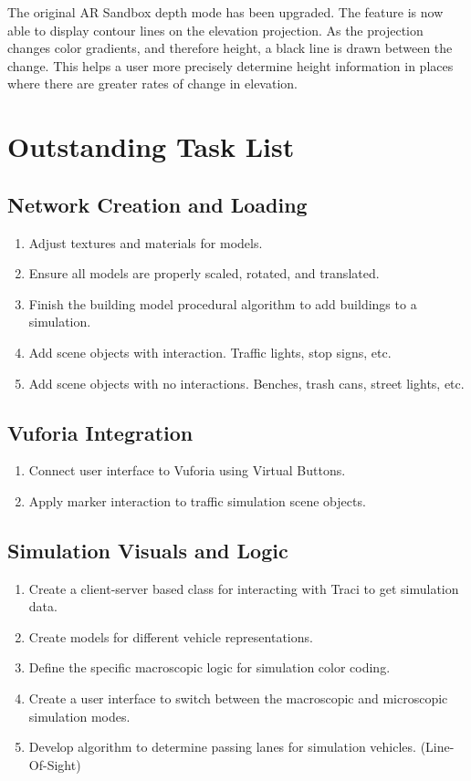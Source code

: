 \documentclass[letterpaper, 10pt, onecolumn, draftclsnofoot]{IEEEtran}
\begin{document}
        The original AR Sandbox depth mode has been upgraded. The feature is now able to display contour lines on the elevation projection. As the projection changes color gradients, and therefore height, a black line is drawn between the change. This helps a user more precisely determine height information in places where there are greater rates of change in elevation. \\

\section{Outstanding Task List}
    \subsection{Network Creation and Loading}
        \begin{enumerate}
            \item Adjust textures and materials for models.
            \item Ensure all models are properly scaled, rotated, and translated.
            \item Finish the building model procedural algorithm to add buildings to a simulation.
            \item Add scene objects with interaction. Traffic lights, stop signs, etc.
            \item Add scene objects with no interactions. Benches, trash cans, street lights, etc.
        \end{enumerate}
        
    \subsection{Vuforia Integration}
        \begin{enumerate}
            \item Connect user interface to Vuforia using Virtual Buttons.
            \item Apply marker interaction to traffic simulation scene objects.
        \end{enumerate}
    
    \subsection{Simulation Visuals and Logic}
        \begin{enumerate}
            \item Create a client-server based class for interacting with Traci to get simulation data.
            \item Create models for different vehicle representations.
            \item Define the specific macroscopic logic for simulation color coding.
            \item Create a user interface to switch between the macroscopic and microscopic simulation modes.
            \item Develop algorithm to determine passing lanes for simulation vehicles. (Line-Of-Sight)
        \end{enumerate}
        
\end{document}
